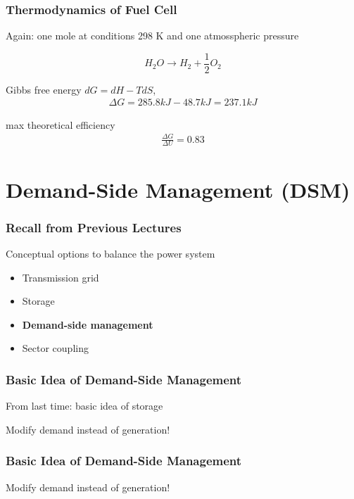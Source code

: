 \documentclass[10pt,aspectratio=169,dvipsnames]{beamer}
\let\olditem\item
\renewcommand{\item}{%
\olditem\vspace{5pt}}
\begin{document}
\begin{frame}
 \frametitle{Thermodynamics of Fuel Cell}

  Again: one mole at conditions 298 K and one atmosspheric pressure

 \begin{equation*}
  H_2 O \rightarrow H_2 + \frac{1}{2} O_2
 \end{equation*}



 Gibbs free energy $dG = dH - TdS$,
 \begin{align*}
 \Delta G = 285.8 kJ - 48.7 kJ = 237.1 kJ
 \end{align*}

 max theoretical efficiency
 \begin{align*}
   \frac{\Delta G}{\Delta U} = 0.83
  \end{align*}

\end{frame}



\section{Demand-Side Management (DSM)}


\begin{frame}
 \frametitle{Recall from Previous Lectures}
 Conceptual options to balance the power system
 \begin{itemize}
  \item Transmission grid
  \item Storage
  \item \textbf{Demand-side management}
  \item Sector coupling
 \end{itemize}

\end{frame}

\begin{frame}
  \frametitle{Basic Idea of Demand-Side Management}

From last time: basic idea of storage
  \vspace{0.5cm}

  Modify demand instead of generation!
\end{frame}
\begin{frame}
  \frametitle{Basic Idea of Demand-Side Management}

 Modify demand instead of generation!
  \vspace{0.5cm}


\end{frame}
\end{document}
